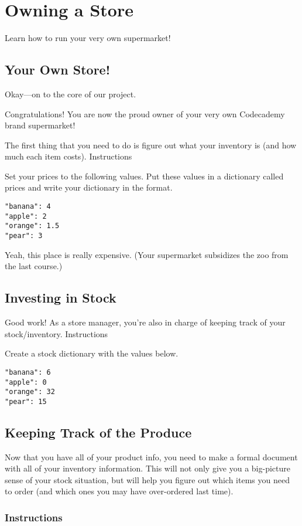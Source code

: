 \documentclass[12pt,a4paper,final,twoside,onecolumn,titlepage]{book}
\begin{document}
\section{Owning a Store}

    Learn how to run your very own supermarket!

\subsection{Your Own Store!}

Okay—on to the core of our project.

Congratulations! You are now the proud owner of your very own Codecademy brand supermarket!

The first thing that you need to do is figure out what your inventory is (and how much each item costs).
Instructions

Set your prices to the following values. Put these values in a dictionary called prices and write your dictionary in the {} format.
\begin{lstlisting}
"banana": 4
"apple": 2
"orange": 1.5
"pear": 3
\end{lstlisting}
Yeah, this place is really expensive. (Your supermarket subsidizes the zoo from the last course.)

\subsection{Investing in Stock}

Good work! As a store manager, you’re also in charge of keeping track of your stock/inventory.
Instructions

Create a stock dictionary with the values below.
\begin{lstlisting}
"banana": 6
"apple": 0
"orange": 32
"pear": 15
\end{lstlisting}

\subsection{Keeping Track of the Produce}

Now that you have all of your product info, you need to make a formal document with all of your inventory information. This will not only give you a big-picture sense of your stock situation, but will help you figure out which items you need to order (and which ones you may have over-ordered last time).
\subsubsection{Instructions}
\end{document}
